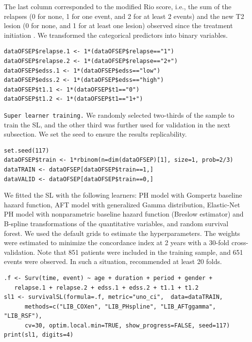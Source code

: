 The last column corresponded to the modified Rio score, i.e., the sum of the relapses (0 for none, 1 for one event, and 2 for at least 2 events) and the new T2 lesion (0 for none, and 1 for at least one lesion) observed since the treatment initiation \citep{sormaniScoringTreatmentResponse2013a}. We transformed the categorical predictors into binary variables.

\begin{verbatim}
dataOFSEP$relapse.1 <- 1*(dataOFSEP$relapse=="1")
dataOFSEP$relapse.2 <- 1*(dataOFSEP$relapse=="2+")
dataOFSEP$edss.1 <- 1*(dataOFSEP$edss=="low")
dataOFSEP$edss.2 <- 1*(dataOFSEP$edss=="high")
dataOFSEP$t1.1 <- 1*(dataOFSEP$t1=="0")
dataOFSEP$t1.2 <- 1*(dataOFSEP$t1=="1+")
\end{verbatim}

\texttt{Super\ learner\ training.} We randomly selected two-thirds of the sample to train the SL, and the other third was further used for validation in the next subsection. We set the seed to ensure the results replicability.

\begin{verbatim}
set.seed(117)
dataOFSEP$train <- 1*rbinom(n=dim(dataOFSEP)[1], size=1, prob=2/3)
dataTRAIN <- dataOFSEP[dataOFSEP$train==1,]
dataVALID <- dataOFSEP[dataOFSEP$train==0,]
\end{verbatim}

We fitted the SL with the following learners: PH model with Gompertz baseline hazard function, AFT model with generalized Gamma distribution, Elastic-Net PH model with nonparametric baseline hazard function (Breslow estimator) and B-spline transformations of the quantitative variables, and random survival forest. We used the default grids to estimate the hyperparameters. The weights were estimated to minimize the concordance index at 2 years with a 30-fold cross-validation. Note that 851 patients were included in the training sample, and 651 events were observed. In such a situation, \citet{phillips_practical_2023} recommended at least 20 folds.

\begin{verbatim}
.f <- Surv(time, event) ~ age + duration + period + gender +
   relapse.1 + relapse.2 + edss.1 + edss.2 + t1.1 + t1.2
sl1 <- survivalSL(formula=.f, metric="uno_ci",  data=dataTRAIN,
      methods=c("LIB_COXen", "LIB_PHspline", "LIB_AFTggamma", "LIB_RSF"),
      cv=30, optim.local.min=TRUE, show_progress=FALSE, seed=117)
print(sl1, digits=4)
\end{verbatim}

